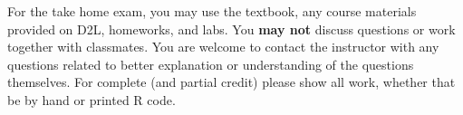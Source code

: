 \documentclass[11pt]{exam}
\begin{document}
%
%
%
For the take home exam, you may use the textbook, any course materials provided on D2L, homeworks, and labs. You {\bf may not} discuss questions or work together with classmates. You are welcome to contact the instructor with any questions related to better explanation or understanding of the questions themselves. For complete (and partial credit) please show all work, whether that be by hand or printed R code.\\
\\
\end{document}
